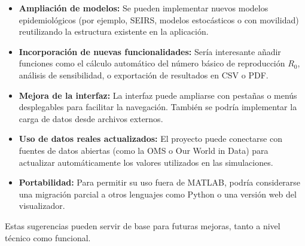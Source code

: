 \begin{itemize}
    \item \textbf{Ampliación de modelos:} Se pueden implementar nuevos modelos epidemiológicos (por ejemplo, SEIRS, modelos estocásticos o con movilidad) reutilizando la estructura existente en la aplicación.

    \item \textbf{Incorporación de nuevas funcionalidades:} Sería interesante añadir funciones como el cálculo automático del número básico de reproducción \( R_0 \), análisis de sensibilidad, o exportación de resultados en CSV o PDF.

    \item \textbf{Mejora de la interfaz:} La interfaz puede ampliarse con pestañas o menús desplegables para facilitar la navegación. También se podría implementar la carga de datos desde archivos externos.

    \item \textbf{Uso de datos reales actualizados:} El proyecto puede conectarse con fuentes de datos abiertas (como la OMS o Our World in Data) para actualizar automáticamente los valores utilizados en las simulaciones.

    \item \textbf{Portabilidad:} Para permitir su uso fuera de MATLAB, podría considerarse una migración parcial a otros lenguajes como Python o una versión web del visualizador.
\end{itemize}

Estas sugerencias pueden servir de base para futuras mejoras, tanto a nivel técnico como funcional.




